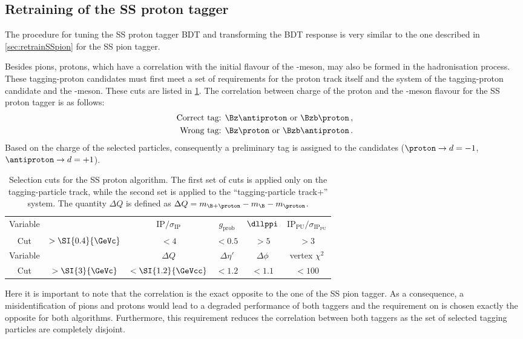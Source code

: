 \subsection{Retraining of the SS proton tagger}
\label{sec:retrainSSproton}

The procedure for tuning the SS proton tagger BDT and transforming the BDT response is very similar to the one described in \cref{sec:retrainSSpion} for the SS pion tagger.

Besides pions, protons, which have a correlation with the initial flavour of the \B-meson, may also be formed in the hadronisation process.
These tagging-proton candidates must first meet a set of requirements for the proton track itself and the system of the tagging-proton candidate and the \B-meson.
These cuts are listed in \cref{tab:selectionSSProton}.
The correlation between charge of the proton and the \B-meson flavour for the SS proton tagger is as follows:
\begin{align*}
	\text{Correct tag: }& \Bz\antiproton \text{ or } \Bzb\proton\,,\\
	\text{Wrong tag: }& \Bz\proton \text{ or } \Bzb\antiproton\,.
\end{align*}
Based on the charge of the selected particles, consequently a preliminary tag is assigned to the \B candidates ($\proton\rightarrow  d=-1$, $\antiproton\rightarrow d=+1$).
\begin{table}[bp]
	\centering
	\caption{Selection cuts for the SS proton algorithm.
	The first set of cuts is applied only on the tagging-particle track, while the second set is applied to the \enquote{tagging-particle track+\B} system.
	The quantity $\Delta Q$ is defined as $\Delta Q=m_{\B+\proton}-m_{\B}-m_{\proton}$.}
	\begin{tabular}{cccccc}
		\toprule
		Variable & \pt & $\text{IP}/\sigma_\text{IP}$ & $g_\text{prob}$ & $\dllppi$ & $\text{IP}_\text{PU}/\sigma_{\text{IP}_\text{PU}}$ \\
		Cut & $>\SI{0.4}{\GeVc}$ & $<4$ & $<0.5$ & $>5$ & $>3$ \\
		\midrule
		Variable & \pt & $\Delta Q$ & $\Delta\eta'$ & $\Delta\phi$  & vertex $\chi^2$ \\
		Cut & $>\SI{3}{\GeVc}$ & $<\SI{1.2}{\GeVcc}$ & $<1.2$ & $<1.1$ & $<100$ \\
		\bottomrule
	\end{tabular}
	\label{tab:selectionSSProton}
\end{table}

Here it is important to note that the correlation is the exact opposite to the one of the SS pion tagger.
As a consequence, a misidentification of pions and protons would lead to a degraded performance of both taggers and the requirement on \dllppi is chosen exactly the opposite for both algorithms.
Furthermore, this requirement reduces the correlation between both taggers as the set of selected tagging particles are completely disjoint.

